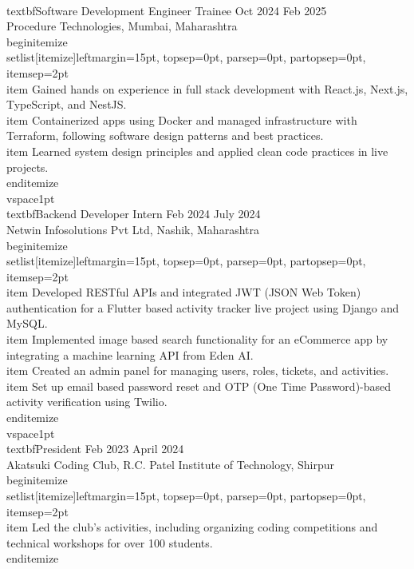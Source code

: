 \documentclass[10pt]{article}
\begin{document}
\\textbf{Software Development Engineer Trainee} \hfill Oct 2024	\textendash{} Feb 2025 \\
Procedure Technologies, Mumbai, Maharashtra \\begin{itemize}\\setlist[itemize]{leftmargin=15pt, topsep=0pt, parsep=0pt, partopsep=0pt, itemsep=2pt}
    \\item Gained hands\textendash{} on experience in full\textendash{} stack development with React.js, Next.js, TypeScript, and NestJS. \\item Containerized apps using Docker and managed infrastructure with Terraform, following software design patterns and best practices. \\item Learned system design principles and applied clean code practices in live projects. \\end{itemize}
\\vspace{1pt}
\\textbf{Backend Developer Intern} \hfill Feb 2024	\textendash{} July 2024 \\
Netwin Infosolutions Pvt Ltd, Nashik, Maharashtra \\begin{itemize}\\setlist[itemize]{leftmargin=15pt, topsep=0pt, parsep=0pt, partopsep=0pt, itemsep=2pt}
    \\item Developed RESTful APIs and integrated JWT (JSON Web Token) authentication for a Flutter\textendash{} based activity tracker live project using Django and MySQL. \\item Implemented image\textendash{} based search functionality for an eCommerce app by integrating a machine learning API from Eden AI. \\item Created an admin panel for managing users, roles, tickets, and activities. \\item Set up email\textendash{} based password reset and OTP (One\textendash{} Time Password)-based activity verification using Twilio. \\end{itemize}
\\vspace{1pt}
\\textbf{President} \hfill Feb 2023	\textendash{} April 2024 \\
Akatsuki Coding Club, R.C. Patel Institute of Technology, Shirpur \\begin{itemize}\\setlist[itemize]{leftmargin=15pt, topsep=0pt, parsep=0pt, partopsep=0pt, itemsep=2pt}
    \\item Led the club’s activities, including organizing coding competitions and technical workshops for over 100 students. \\end{itemize}
\end{document}
